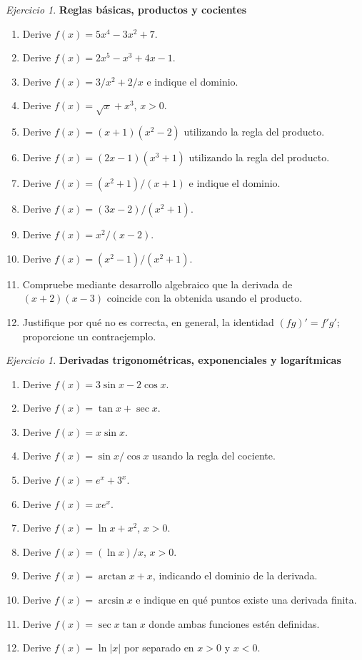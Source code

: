 \documentclass[12pt]{article}
\theoremstyle{remark}
\newtheorem{Ejer}[definicion]{Ejercicio}
\begin{document}
\begin{Ejer}\textbf{Reglas básicas, productos y cocientes}
\begin{enumerate}[resume=banco]
\item Derive $f(x)=5x^4-3x^2+7$.
\item Derive $f(x)=2x^5-x^3+4x-1$.
\item Derive $f(x)=3/x^2+2/x$ e indique el dominio.
\item Derive $f(x)=\sqrt x+x^3$, $x>0$.
\item Derive $f(x)=(x+1)(x^2-2)$ utilizando la regla del producto.
\item Derive $f(x)=(2x-1)(x^3+1)$ utilizando la regla del producto.
\item Derive $f(x)=(x^2+1)/(x+1)$ e indique el dominio.
\item Derive $f(x)=(3x-2)/(x^2+1)$.
\item Derive $f(x)=x^2/(x-2)$.
\item Derive $f(x)=(x^2-1)/(x^2+1)$.
\item Compruebe mediante desarrollo algebraico que la derivada de $(x+2)(x-3)$ coincide con la obtenida usando el producto.
\item Justifique por qué no es correcta, en general, la identidad $(fg)'=f'g'$; proporcione un contraejemplo.
\end{enumerate}
\end{Ejer}

\begin{Ejer}\textbf{Derivadas trigonométricas, exponenciales y logarítmicas}
\begin{enumerate}[resume=banco]
\item Derive $f(x)=3\sin x-2\cos x$.
\item Derive $f(x)=\tan x+\sec x$.
\item Derive $f(x)=x\sin x$.
\item Derive $f(x)=\sin x/\cos x$ usando la regla del cociente.
\item Derive $f(x)=e^x+3^x$.
\item Derive $f(x)=xe^x$.
\item Derive $f(x)=\ln x+x^2$, $x>0$.
\item Derive $f(x)=(\ln x)/x$, $x>0$.
\item Derive $f(x)=\arctan x+x$, indicando el dominio de la derivada.
\item Derive $f(x)=\arcsin x$ e indique en qué puntos existe una derivada finita.
\item Derive $f(x)=\sec x\tan x$ donde ambas funciones estén definidas.
\item Derive $f(x)=\ln|x|$ por separado en $x>0$ y $x<0$.
\end{enumerate}
\end{Ejer}
\end{document}
